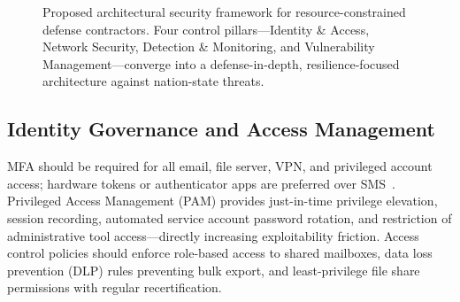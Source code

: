 \documentclass[sigconf,nonacm]{acmart}
\begin{document}
\begin{figure}[t]
\caption{Proposed architectural security framework for resource-constrained defense
  contractors. Four control pillars---Identity \& Access, Network Security, Detection
  \& Monitoring, and Vulnerability Management---converge into a defense-in-depth,
  resilience-focused architecture against nation-state threats.}
\label{fig:framework}
\end{figure}

\subsection{Identity Governance and Access Management}

MFA should be required for all email, file server, VPN, and privileged account access;
hardware tokens or authenticator apps are preferred over SMS~\cite{cisa2024russia}.
Privileged Access Management (PAM) provides just-in-time privilege elevation,
session recording, automated service account password rotation, and restriction of
administrative tool access---directly increasing exploitability friction.
Access control policies should enforce role-based access to shared mailboxes, data loss
prevention (DLP) rules preventing bulk export, and least-privilege file share
permissions with regular recertification.
\end{document}
